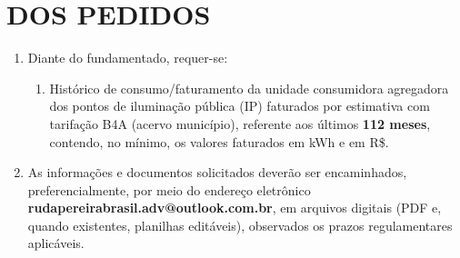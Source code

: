 \section{DOS PEDIDOS}

\begin{enumerate}[resume]
  \item Diante do fundamentado, requer-se:
  \begin{enumerate}
    \item Histórico de consumo/faturamento da unidade consumidora agregadora dos pontos de iluminação pública (IP) faturados por estimativa com tarifação B4A (acervo município), referente aos últimos \textbf{112 meses}, contendo, no mínimo, os valores faturados em kWh e em R\$.
  \end{enumerate}
  \item As informações e documentos solicitados deverão ser encaminhados, preferencialmente, por meio do endereço eletrônico \textbf{rudapereirabrasil.adv@outlook.com.br}, em arquivos digitais (PDF e, quando existentes, planilhas editáveis), observados os prazos regulamentares aplicáveis.
\end{enumerate}





